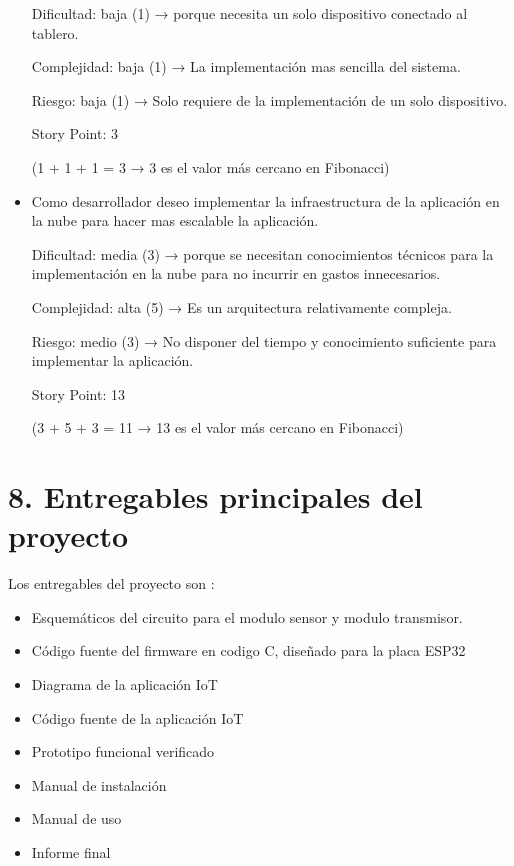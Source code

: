 \documentclass[
11pt, %
]{charter}
\begin{document}
\begin{itemize}
Dificultad: baja (1) → porque necesita un solo dispositivo conectado al tablero.

Complejidad: baja (1) → La implementación mas sencilla del sistema.

Riesgo: baja (1) → Solo requiere de la implementación de un solo dispositivo.

Story Point: 3 

(1 + 1 + 1 = 3 → 3 es el valor más cercano en Fibonacci)

\item{Como desarrollador deseo implementar la infraestructura de la aplicación en la nube para hacer mas escalable la aplicación.}


Dificultad: media (3) → porque se necesitan conocimientos técnicos para la implementación en la nube para no incurrir en gastos innecesarios.

Complejidad: alta (5) → Es un arquitectura relativamente compleja.

Riesgo: medio (3) → No disponer del tiempo y conocimiento suficiente para implementar la aplicación.

Story Point: 13 

(3 + 5 + 3 = 11 → 13 es el valor más cercano en Fibonacci)


\end{itemize}



\section{8. Entregables principales del proyecto}
\label{sec:entregables}


Los entregables del proyecto son :

\begin{itemize}
	
	\item Esquemáticos del circuito para el modulo sensor y modulo transmisor.
	\item Código fuente del firmware en codigo C, diseñado para la placa ESP32
	\item Diagrama de la aplicación	IoT
	\item Código fuente de la aplicación IoT
	\item Prototipo funcional verificado	
	\item Manual de instalación
	\item Manual de uso
	\item Informe final
	
\end{itemize}
\end{document}
